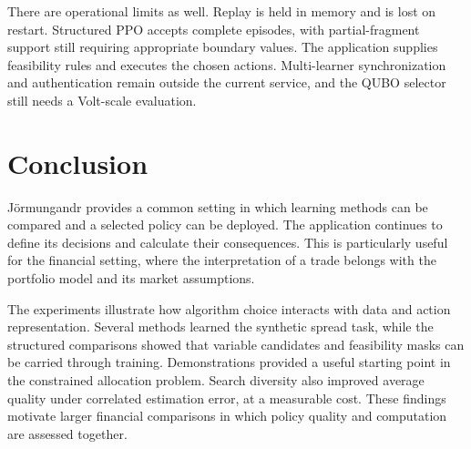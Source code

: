 \documentclass{strategynet-journal}
\begin{document}
\begin{SNcolumns}
There are operational limits as well. Replay is held in memory and is lost
on restart. Structured PPO accepts complete episodes, with partial-fragment
support still requiring appropriate boundary values. The application supplies
feasibility rules and executes the chosen actions. Multi-learner synchronization
and authentication remain outside the current service, and the QUBO selector
still needs a Volt-scale evaluation.

\section{Conclusion}

Jörmungandr provides a common setting in which learning methods can be
compared and a selected policy can be deployed. The application continues to
define its decisions and calculate their consequences. This is particularly
useful for the financial setting, where the interpretation of a trade belongs
with the portfolio model and its market assumptions.

The experiments illustrate how algorithm choice interacts with data and action
representation. Several methods learned the synthetic spread task, while the
structured comparisons showed that variable candidates and feasibility masks
can be carried through training. Demonstrations provided a useful starting
point in the constrained allocation problem. Search diversity also improved
average quality under correlated estimation error, at a measurable cost.
These findings motivate larger financial comparisons in which policy quality
and computation are assessed together.

\end{SNcolumns}
\end{document}
